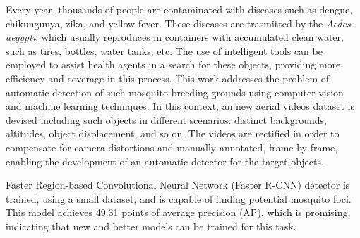 \begin{foreignabstract}

Every year, thousands of people are contaminated with diseases such as dengue, chikungunya, zika, and yellow fever.
These diseases are trasmitted by the {\it Aedes aegypti}, which usually reproduces in containers with accumulated clean water, such as tires, bottles, water tanks, etc. 
The use of intelligent tools can be employed to assist health agents in a search for these objects, providing more efficiency and coverage in this process. 
This work addresses the problem of automatic detection of such mosquito breeding grounds using computer vision and machine learning techniques. 
In this context, an new aerial videos dataset is devised including such objects in different scenarios: distinct backgrounds, altitudes, object displacement, and so on. 
The videos are rectified in order to compensate for camera distortions and manually annotated, frame-by-frame, enabling the development of an automatic detector for the target objects.

Faster Region-based Convolutional Neural Network (Faster R-CNN) detector is trained, using a small dataset, and is capable of finding potential mosquito foci.
This model achieves 49.31 points of average precision (AP), which is promising, indicating that new and better models can be trained for this task.


\end{foreignabstract}

